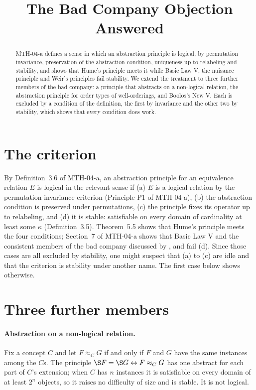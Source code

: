 \documentclass{situationist-preprint}
\title{The Bad Company Objection Answered}
\begin{document}
\maketitle

\begin{abstract}
MTH-04-a defines a sense in which an abstraction principle is logical, by permutation invariance, preservation of the abstraction condition, uniqueness up to relabeling and stability, and shows that Hume's principle meets it while Basic Law V, the nuisance principle and Weir's principles fail stability. We extend the treatment to three further members of the bad company: a principle that abstracts on a non-logical relation, the abstraction principle for order types of well-orderings, and Boolos's New V. Each is excluded by a condition of the definition, the first by invariance and the other two by stability, which shows that every condition does work.
\end{abstract}

\section{The criterion}\label{s:crit}

By Definition~3.6 of MTH-04-a, an abstraction principle for an equivalence relation $E$ is logical in the relevant sense if (a) $E$ is a logical relation by the permutation-invariance criterion (Principle P1 of MTH-04-a), (b) the abstraction condition is preserved under permutations, (c) the principle fixes its operator up to relabeling, and (d) it is stable: satisfiable on every domain of cardinality at least some $\kappa$ (Definition~3.5). Theorem~5.5 shows that Hume's principle meets the four conditions; Section~7 of MTH-04-a shows that Basic Law V and the consistent members of the bad company discussed by \citet{Boolos1990}, \citet{Wright1997} and \citet{Weir2003} fail (d). Since those cases are all excluded by stability, one might suspect that (a) to (c) are idle and that the criterion is stability under another name. The first case below shows otherwise.

\section{Three further members}\label{s:members}

\paragraph{Abstraction on a non-logical relation.} Fix a concept $C$ and let $F \approx_C G$ if and only if $F$ and $G$ have the same instances among the $C$s. The principle $\S F = \S G \leftrightarrow F \approx_C G$ has one abstract for each part of $C$'s extension; when $C$ has $n$ instances it is satisfiable on every domain of at least $2^n$ objects, so it raises no difficulty of size and is stable. It is not logical.
\end{document}
